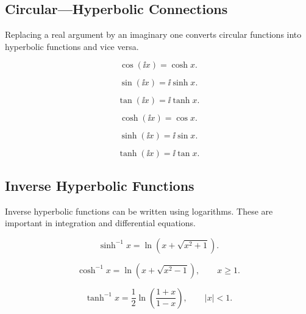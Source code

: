 \documentclass{otscience}
\begin{document}
\subsection{Circular---Hyperbolic Connections}

Replacing a real argument by an imaginary one converts circular functions into hyperbolic functions and vice versa.

\begin{formulaboxnosplit}
\[
\cos(\ii x)=\cosh x.
\]

\[
\sin(\ii x)=\ii\sinh x.
\]

\[
\tan(\ii x)=\ii\tanh x.
\]

\[
\cosh(\ii x)=\cos x.
\]

\[
\sinh(\ii x)=\ii\sin x.
\]

\[
\tanh(\ii x)=\ii\tan x.
\]
\end{formulaboxnosplit}

\subsection{Inverse Hyperbolic Functions}

Inverse hyperbolic functions can be written using logarithms. These are important in integration and differential equations.

\begin{formulabox}
\[
\sinh^{-1}x=\ln(x+\sqrt{x^2+1}).
\]

\[
\cosh^{-1}x=\ln(x+\sqrt{x^2-1}),\qquad x\ge1.
\]

\[
\tanh^{-1}x=\frac12\ln\left(\frac{1+x}{1-x}\right),\qquad |x|<1.
\]
\end{formulabox}
\end{document}
